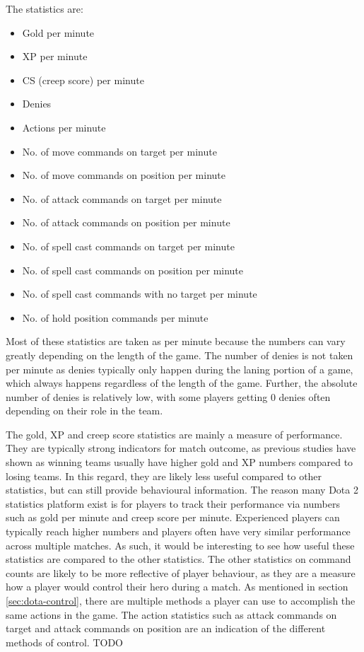 \documentclass[Report.tex]{subfiles}
\begin{document}
The statistics are:
\begin{itemize}
\item Gold per minute
\item XP per minute
\item CS (creep score) per minute
\item Denies
\item Actions per minute
\item No. of move commands on target per minute
\item No. of move commands on position per minute
\item No. of attack commands on target per minute
\item No. of attack commands on position per minute
\item No. of spell cast commands on target per minute
\item No. of spell cast commands on position per minute
\item No. of spell cast commands with no target per minute
\item No. of hold position commands per minute
\end{itemize}
Most of these statistics are taken as per minute because the numbers can vary greatly depending on the length of the game. The number of denies is not taken per minute as denies typically only happen during the laning portion of a game, which always happens regardless of the length of the game. Further, the absolute number of denies is relatively low, with some players getting 0 denies often depending on their role in the team.

The gold, XP and creep score statistics are mainly a measure of performance. They are typically strong indicators for match outcome, as previous studies have shown \cite{dota-mixed-rank-win, dota-kinkade, dota-pu-yang, dota-yang} as winning teams usually have higher gold and XP numbers compared to losing teams. In this regard, they are likely less useful compared to other statistics, but can still provide behavioural information. The reason many Dota 2 statistics platform exist is for players to track their performance via numbers such as gold per minute and creep score per minute. Experienced players can typically reach higher numbers and players often have very similar performance across multiple matches. As such, it would be interesting to see how useful these statistics are compared to the other statistics. The other statistics on command counts are likely to be more reflective of player behaviour, as they are a measure how a player would control their hero during a match. As mentioned in section \ref{sec:dota-control}, there are multiple methods a player can use to accomplish the same actions in the game. The action statistics such as attack commands on target and attack commands on position are an indication of the different methods of control. TODO
\end{document}
